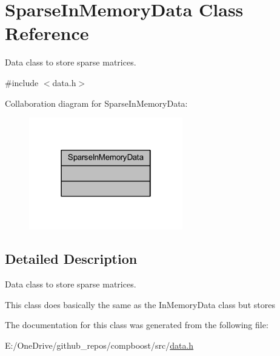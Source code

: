 \hypertarget{class_sparse_in_memory_data}{}\section{Sparse\+In\+Memory\+Data Class Reference}
\label{class_sparse_in_memory_data}


Data class to store sparse matrices.  




{\ttfamily \#include $<$data.\+h$>$}



Collaboration diagram for Sparse\+In\+Memory\+Data\+:\nopagebreak
\begin{figure}[H]
\begin{center}
\leavevmode
\includegraphics[width=190pt]{class_sparse_in_memory_data__coll__graph}
\end{center}
\end{figure}


\subsection{Detailed Description}
Data class to store sparse matrices. 

This class does basically the same as the {\ttfamily In\+Memory\+Data} class but stores 

The documentation for this class was generated from the following file\+:\begin{DoxyCompactItemize}
\item 
E\+:/\+One\+Drive/github\+\_\+repos/compboost/src/\mbox{\hyperlink{data_8h}{data.\+h}}\end{DoxyCompactItemize}

